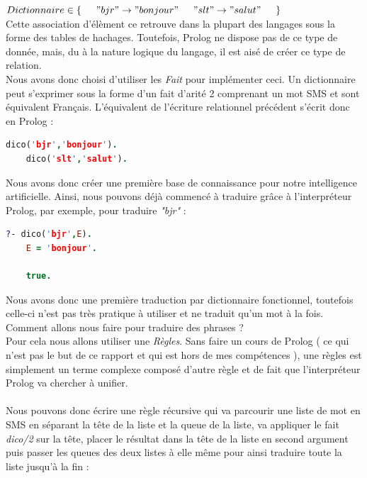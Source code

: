 \documentclass[11pt]{book}
\begin{document}
		$ 
			Dictionnaire \in \{ \\
			\indent	"bjr" \rightarrow "bonjour"\\
			\indent "slt" \rightarrow "salut"\\
			\indent \}
		$\\
	
	\noindent Cette association d'élèment ce retrouve dans la plupart des langages sous la forme des tables de hachages. Toutefois, Prolog ne dispose pas de ce type de donnée, mais, du à la nature logique du langage, il est aisé de créer ce type de relation.\\
	Nous avons donc choisi d'utiliser les \emph{Fait} pour implémenter ceci. Un dictionnaire peut s'exprimer sous la forme d'un fait d'arité 2 comprenant un mot SMS et sont équivalent Français. L'équivalent de l'écriture relationnel précédent s'écrit donc en Prolog :\\
	
	\begin{lstlisting}[language=Prolog]
	dico('bjr','bonjour').
	dico('slt','salut').
	\end{lstlisting}
	
	Nous avons donc créer une première base de connaissance pour notre intelligence artificielle. Ainsi, nous pouvons déjà commencé à traduire grâce à l’interpréteur Prolog, par exemple, pour traduire {\em "bjr"} :
	\begin{lstlisting}[language=Prolog]
	?- dico('bjr',E).
	E = 'bonjour'.
	
	true.
	\end{lstlisting}
	
	Nous avons donc une première traduction par dictionnaire fonctionnel, toutefois celle-ci n'est pas très pratique à utiliser et ne traduit qu'un mot à la fois. Comment allons nous faire pour traduire des phrases ?\\
	Pour cela nous allons utiliser une {\em Règles}. Sans faire un cours de Prolog ( ce qui n'est pas le but de ce rapport et qui est hors de mes compétences ), une règles est simplement un terme complexe composé d'autre règle et de fait que l’interpréteur Prolog va chercher à unifier.
	\paragraph{}
	Nous pouvons donc écrire une règle récursive qui va parcourir une liste de mot en SMS en séparant la tête de la liste et la queue de la liste, va appliquer le fait {\em dico/2} sur la tête, placer le résultat dans la tête de la liste en second argument puis passer les queues des deux listes à elle même pour ainsi traduire toute la liste jusqu'à la fin :
	
\end{document}
